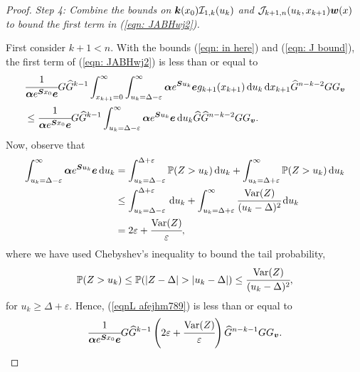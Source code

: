 \begin{proof}
\emph{Step 4: Combine the bounds on \(\boldsymbol k(x_0)\mathcal I_{1,k}(u_k) \) and \(\mathcal J_{k+1,n}(u_k,x_{k+1})  {\boldsymbol w}(x)\) to bound the first term in (\ref{eqn: JABHwj2}).}	

		First consider \(k+1<n\). With the bounds (\ref{eqn: in here}) and (\ref{eqn: J bound}), the first term of (\ref{eqn: JABHwj2}) is less than or equal to 
		\begin{align}
			&\cfrac{1}{\boldsymbol \alpha e^{\boldsymbol{S} x_0 }\boldsymbol e}G \widehat G^{k-1}
			\int_{x_{k+1}=0}^\infty \int_{u_k=\Delta-\varepsilon}^\infty \boldsymbol \alpha e^{\boldsymbol{S}u_k}\boldsymbol e g_{k+1}(x_{k+1}) \, \mathrm{d} u_k \, \mathrm{d} x_{k+1}\widehat G^{n-k-2} G G_{\boldsymbol v}\nonumber 
			\\&\leq \cfrac{1}{\boldsymbol \alpha e^{\boldsymbol{S} x_0}\boldsymbol e}G \widehat G^{k-1}  
			\int_{u_k=\Delta-\varepsilon}^\infty \boldsymbol \alpha e^{\boldsymbol{S}u_k}\boldsymbol e \, \mathrm{d} u_k \widehat G \widehat G^{n-k-2} G G_{\boldsymbol v}. \label{eqnL afejhm789}
		\end{align}
		Now, observe that 
		\begin{align}
			\int_{u_k=\Delta-\varepsilon}^\infty \boldsymbol \alpha e^{\boldsymbol{S}u_k}\boldsymbol e \, \mathrm{d} u_k &= \int_{u_k=\Delta-\varepsilon}^{\Delta+\varepsilon} \mathbb P(Z> u_k) \, \mathrm{d} u_k + \int_{u_k=\Delta+\varepsilon}^\infty \mathbb P(Z> u_k) \, \mathrm{d} u_k\nonumber
			\\&\leq \int_{u_k=\Delta-\varepsilon}^{\Delta+\varepsilon} \, \mathrm{d} u_k + \int_{u_k=\Delta+\varepsilon}^\infty \cfrac{\mathrm{Var}(Z)}{(u_k-\Delta)^2} \, \mathrm{d} u_k\nonumber
			\\&= 2\varepsilon + \cfrac{\mathrm{Var}(Z)}{\varepsilon},\label{eqn:kdjf55}
		\end{align}
		where we have used Chebyshev's inequality to bound the tail probability, 
		\[\mathbb P(Z> u_k) \leq \mathbb P(|Z-\Delta|> |u_k-\Delta|) \leq \cfrac{\var(Z)}{(u_k-\Delta)^2},\]
		for \(u_k \geq \Delta +\varepsilon\). Hence, (\ref{eqnL afejhm789}) is less than or equal to 
		\[\cfrac{1}{\boldsymbol \alpha e^{\boldsymbol{S} x_0}\boldsymbol e}G \widehat G^{k-1}  
			\left(2\varepsilon + \cfrac{\mathrm{Var}(Z)}{\varepsilon}\right) \widehat G^{n-k-1} G G_{\boldsymbol v}.\]
		

\end{proof}

